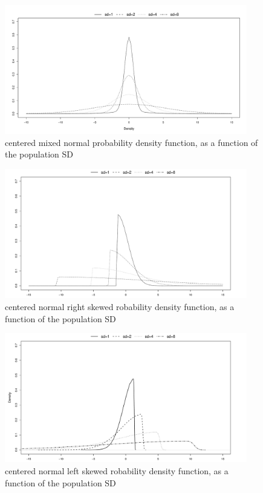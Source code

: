 \documentclass[man,floatsintext]{apa6}
\begin{document}
\begin{appendix}
\begin{figure}
\includegraphics[width=400px]{W-test_files/figure-latex/unnamed-chunk-20-1} \caption{centered mixed normal probability density function, as a function of the population SD}\label{fig:unnamed-chunk-20}
\end{figure}

\begin{figure}
\includegraphics[width=400px]{W-test_files/figure-latex/unnamed-chunk-21-1} \caption{centered normal right skewed robability density function, as a function of the population SD}\label{fig:unnamed-chunk-21}
\end{figure}

\begin{figure}
\includegraphics[width=400px]{W-test_files/figure-latex/unnamed-chunk-22-1} \caption{centered normal left skewed robability density function, as a function of the population SD}\label{fig:unnamed-chunk-22}
\end{figure}


\end{appendix}
\end{document}
